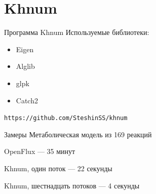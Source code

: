 \documentclass[aspectratio=169]{beamer}
\begin{document}
\section{Khnum}
\begin{frame}{Программа Khnum}
Используемые библиотеки:
\begin{itemize}
	\item Eigen
	\item Alglib
	\item glpk
	\item Catch2
\end{itemize}

\texttt{https://github.com/SteshinSS/khnum}
\end{frame}

\begin{frame}{Замеры}
Метаболическая модель из 169 реакций

OpenFlux --- 35 минут

Khnum, один поток --- 22 секунды

Khnum, шестнадцать потоков --- 4 секунды
\end{frame}
\end{document}
